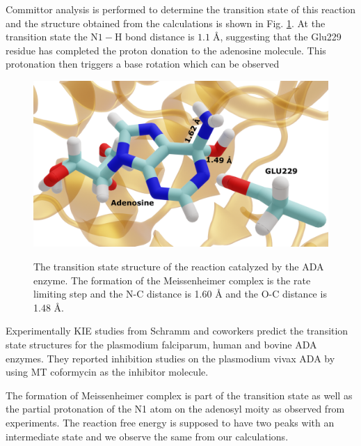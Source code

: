 \documentclass[journal=jpcbfk,manuscript=article,layout=traditional]{achemso}
\begin{document}
Committor analysis is performed to determine the transition state of this reaction
and the structure obtained from the calculations is shown in Fig. \ref{fig:ada-trans}.
At the transition state the N$1-$H bond distance is $1.1\;${\AA}, suggesting that the 
Glu229 residue has completed the proton donation to the adenosine molecule. This protonation
then triggers a base rotation which can be observed    
\begin{figure}
\centering
\includegraphics[scale=0.12]{blender-images/ada/new-ada-trans.png}
\label{fig:ada-trans}
\caption{The transition state structure of the reaction catalyzed by the ADA enzyme.
The formation of the Meissenheimer complex is the rate limiting step and the N-C distance is 
1.60 {\AA} and the O-C distance is 1.48 {\AA}.}
\end{figure}
Experimentally KIE studies 
from Schramm and coworkers \cite{Luo07JAmChemSoc129p8008,Ho09Biochemistry48p9618}
predict the transition state structures for the plasmodium falciparum, human and bovine 
ADA enzymes. They reported inhibition studies on the plasmodium vivax ADA by using 
MT coformycin as the inhibitor molecule. 


The formation of Meissenheimer complex is part of the 
transition state as well as the partial protonation of the 
N1 atom on the adenosyl moity as observed from experiments. 
The reaction free energy is supposed to have two peaks with 
an intermediate state and we observe the same from our calculations. 
\end{document}
